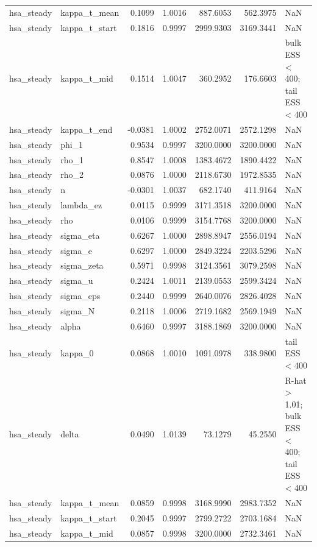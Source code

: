 \begin{tabular}{llrrrrl}
hsa\_steady & kappa\_t\_mean & 0.1099 & 1.0016 & 887.6053 & 562.3975 & NaN \\
hsa\_steady & kappa\_t\_start & 0.1816 & 0.9997 & 2999.9303 & 3169.3441 & NaN \\
hsa\_steady & kappa\_t\_mid & 0.1514 & 1.0047 & 360.2952 & 176.6603 & bulk ESS < 400; tail ESS < 400 \\
hsa\_steady & kappa\_t\_end & -0.0381 & 1.0002 & 2752.0071 & 2572.1298 & NaN \\
hsa\_steady & phi\_1 & 0.9534 & 0.9997 & 3200.0000 & 3200.0000 & NaN \\
hsa\_steady & rho\_1 & 0.8547 & 1.0008 & 1383.4672 & 1890.4422 & NaN \\
hsa\_steady & rho\_2 & 0.0876 & 1.0000 & 2118.6730 & 1972.8535 & NaN \\
hsa\_steady & n & -0.0301 & 1.0037 & 682.1740 & 411.9164 & NaN \\
hsa\_steady & lambda\_ez & 0.0115 & 0.9999 & 3171.3518 & 3200.0000 & NaN \\
hsa\_steady & rho & 0.0106 & 0.9999 & 3154.7768 & 3200.0000 & NaN \\
hsa\_steady & sigma\_eta & 0.6267 & 1.0000 & 2898.8947 & 2556.0194 & NaN \\
hsa\_steady & sigma\_e & 0.6297 & 1.0000 & 2849.3224 & 2203.5296 & NaN \\
hsa\_steady & sigma\_zeta & 0.5971 & 0.9998 & 3124.3561 & 3079.2598 & NaN \\
hsa\_steady & sigma\_u & 0.2424 & 1.0011 & 2139.0553 & 2599.3424 & NaN \\
hsa\_steady & sigma\_eps & 0.2440 & 0.9999 & 2640.0076 & 2826.4028 & NaN \\
hsa\_steady & sigma\_N & 0.2118 & 1.0006 & 2719.1682 & 2569.1949 & NaN \\
hsa\_steady & alpha & 0.6460 & 0.9997 & 3188.1869 & 3200.0000 & NaN \\
hsa\_steady & kappa\_0 & 0.0868 & 1.0010 & 1091.0978 & 338.9800 & tail ESS < 400 \\
hsa\_steady & delta & 0.0490 & 1.0139 & 73.1279 & 45.2550 & R-hat > 1.01; bulk ESS < 400; tail ESS < 400 \\
hsa\_steady & kappa\_t\_mean & 0.0859 & 0.9998 & 3168.9990 & 2983.7352 & NaN \\
hsa\_steady & kappa\_t\_start & 0.2045 & 0.9997 & 2799.2722 & 2703.1684 & NaN \\
hsa\_steady & kappa\_t\_mid & 0.0857 & 0.9998 & 3200.0000 & 2732.3461 & NaN \\

\end{tabular}
